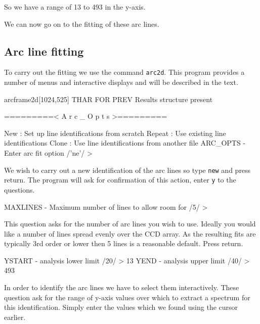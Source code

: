 \documentclass[twoside,11pt]{starlink}
\providecommand{\scspec}[2]{#1}
\begin{document}
So we have a range of 13 to 493 in the y-axis.

We can now go on to the fitting of these arc lines.

\subsection{Arc line fitting}

To carry out the fitting we use the 
command \texttt{arc2d}. This program provides a number of menus and
interactive displays and will be described in the text.


{
\scspec{\small}{ }
\begin{terminalv}

arcframe2d[1024,525] THAR FOR PREV
Results structure present

=========< A r c _ O p t s >=========

New      : Set up line identifications from scratch
Repeat   : Use existing line identifications
Clone    : Use line identifications from another file
ARC_OPTS - Enter arc fit option /'ne'/ >

\end{terminalv}
}

We wish to carry out a new identification of the arc lines so type
\texttt{new} and press return. The program will ask for confirmation of
this action, enter \texttt{y} to the questions.

{
\scspec{\small}{ }
\begin{terminalv}
MAXLINES - Maximum number of lines to allow room for /5/ >
\end{terminalv}
}

This question asks for the number of arc lines you wish to use.
Ideally you would like a number of lines spread evenly over the CCD
array. As the resulting fits are typically 3rd order or lower then 5
lines is a reasonable default. Press return.

{\scspec{\small}{}
\begin{terminalv}
YSTART - analysis lower limit /20/ > 13
YEND - analysis upper limit /40/ > 493
\end{terminalv}
}



In order to identify the arc lines we have to select them
interactively. These question ask for the range of y-axis values over
which to extract a spectrum for this identification. Simply enter the
values which we found using the cursor earlier.
\end{document}
